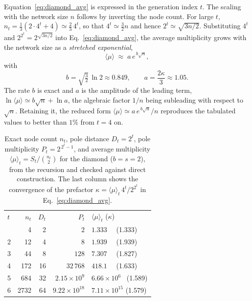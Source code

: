 \documentclass[reprint,aps,pre,amsmath,amssymb,superscriptaddress,showpacs]{revtex4-1}
\begin{document}
Equation~\eqref{eq:diamond_avg} is expressed in the generation index $t$. The scaling with the network size $n$ follows by inverting the node count. For large $t$, $n_t=\frac13(2\cdot4^{t}+4)\simeq\frac23\,4^{t}$, so that $4^{t}\simeq\frac32 n$ and hence $2^{t}\simeq\sqrt{3n/2}$. Substituting $4^{t}$ and $2^{2^{t}}=2^{\sqrt{3n/2}}$ into Eq.~\eqref{eq:diamond_avg}, the average multiplicity grows with the network size as a \emph{stretched exponential},
%
\begin{equation}
\langle\mu\rangle \;\approx\; a\,e^{\,b\sqrt{n}},
\label{eq:diamond_n}
\end{equation}
%
with
%
\begin{equation}
b=\sqrt{\tfrac32}\,\ln 2\approx0.849,
\qquad
a=\frac{2\kappa}{3}\approx1.05 .
\label{eq:diamond_ab}
\end{equation}
%
The rate $b$ is exact and $a$ is the amplitude of the leading term, $\ln\langle\mu\rangle\simeq b\sqrt{n}+\ln a$, the algebraic factor $1/n$ being subleading with respect to $\sqrt{n}$. Retaining it, the reduced form $\langle\mu\rangle\simeq a\,e^{\,b\sqrt{n}}/n$ reproduces the tabulated values to better than $1\%$ from $t=4$ on.

\begin{table}[t]
\caption{Exact node count $n_t$, pole distance $D_t=2^{t}$, pole multiplicity $P_t=2^{\,2^{t}-1}$, and average multiplicity $\langle\mu\rangle_t=S_t/\binom{n_t}{2}$ for the diamond ($b=s=2$), from the recursion and checked against direct construction. The last column shows the convergence of the prefactor $\kappa=\langle\mu\rangle_t\,4^{t}/2^{2^{t}}$ in Eq.~\eqref{eq:diamond_avg}.}
\label{tab:diamond}
\begin{ruledtabular}
\begin{tabular}{lrrrl}
$t$ & $n_t$ & $D_t$ & $P_t$ & $\langle\mu\rangle_t$ \quad ($\kappa$) \\
\colrule
1 & 4     & 2  & $2$              & $1.333$ \ \ (1.333) \\
2 & 12    & 4  & $8$              & $1.939$ \ \ (1.939) \\
3 & 44    & 8  & $128$            & $7.307$ \ \ (1.827) \\
4 & 172   & 16 & $32\,768$        & $418.1$ \ \ (1.633) \\
5 & 684   & 32 & $2.15\times10^{9}$  & $6.66\times10^{6}$ \ (1.589) \\
6 & 2732  & 64 & $9.22\times10^{18}$ & $7.11\times10^{15}$ (1.579) \\
\end{tabular}
\end{ruledtabular}
\end{table}
\end{document}
